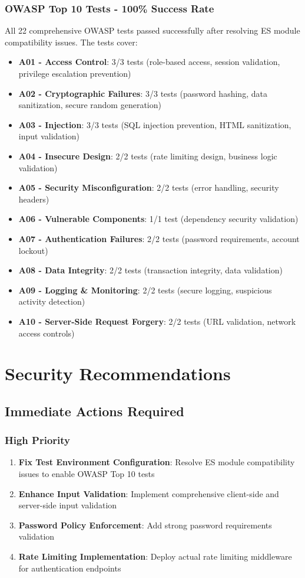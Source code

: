 \documentclass[12pt]{article}
\begin{document}
\subsubsection{OWASP Top 10 Tests - 100\% Success Rate}
All 22 comprehensive OWASP tests passed successfully after resolving ES module compatibility issues. The tests cover:
\begin{itemize}
    \item \textbf{A01 - Access Control}: 3/3 tests (role-based access, session validation, privilege escalation prevention)
    \item \textbf{A02 - Cryptographic Failures}: 3/3 tests (password hashing, data sanitization, secure random generation)
    \item \textbf{A03 - Injection}: 3/3 tests (SQL injection prevention, HTML sanitization, input validation)
    \item \textbf{A04 - Insecure Design}: 2/2 tests (rate limiting design, business logic validation)
    \item \textbf{A05 - Security Misconfiguration}: 2/2 tests (error handling, security headers)
    \item \textbf{A06 - Vulnerable Components}: 1/1 test (dependency security validation)
    \item \textbf{A07 - Authentication Failures}: 2/2 tests (password requirements, account lockout)
    \item \textbf{A08 - Data Integrity}: 2/2 tests (transaction integrity, data validation)
    \item \textbf{A09 - Logging \& Monitoring}: 2/2 tests (secure logging, suspicious activity detection)
    \item \textbf{A10 - Server-Side Request Forgery}: 2/2 tests (URL validation, network access controls)
\end{itemize}

\section{Security Recommendations}

\subsection{Immediate Actions Required}

\subsubsection{High Priority}
\begin{enumerate}
    \item \textbf{Fix Test Environment Configuration}: Resolve ES module compatibility issues to enable OWASP Top 10 tests
    \item \textbf{Enhance Input Validation}: Implement comprehensive client-side and server-side input validation
    \item \textbf{Password Policy Enforcement}: Add strong password requirements validation
    \item \textbf{Rate Limiting Implementation}: Deploy actual rate limiting middleware for authentication endpoints
\end{enumerate}
\end{document}
